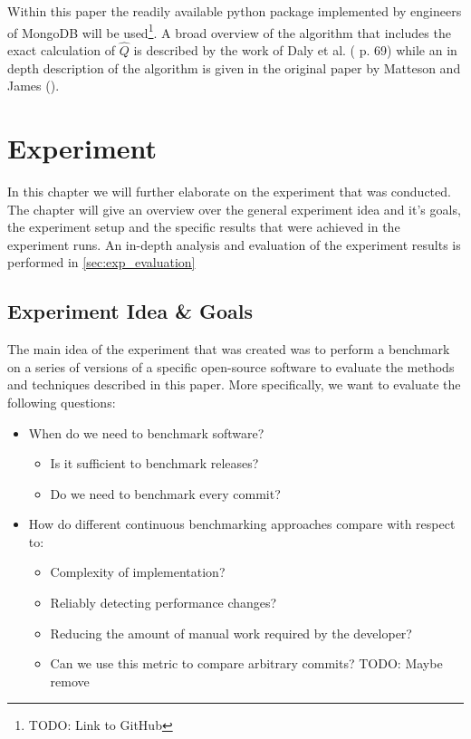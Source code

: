 \documentclass[	runningheads,
				a4paper]{llncs}
\begin{document}
	Within this paper the readily available python package implemented by engineers of MongoDB will be used\footnote{TODO: Link to GitHub}. A broad overview of the algorithm that includes the exact calculation of $\hat{Q}$ is described by the work of Daly et al. (\cite{daly2020} p. 69) while an in depth description of the algorithm is given in the original paper by Matteson and James (\cite{Matteson2014}).

\section{Experiment}
In this chapter we will further elaborate on the experiment that was conducted. The chapter will give an overview over the general experiment idea and it's goals, the experiment setup and the specific results that were achieved in the experiment runs. An in-depth analysis and evaluation of the experiment results is performed in \autoref{sec:exp_evaluation}

	\subsection{Experiment Idea \& Goals}
	\label{ssec:exp_goals}

	The main idea of the experiment that was created was to perform a benchmark on a series of versions of a specific open-source software to evaluate the methods and techniques described in this paper. More specifically, we want to evaluate the following questions:
	\begin{itemize}
		\item When do we need to benchmark software?
			\begin{itemize}
				\item Is it sufficient to benchmark releases?
				\item Do we need to benchmark every commit?
			\end{itemize}
		\item How do different continuous benchmarking approaches compare with respect to:
			\begin{itemize}
				\item Complexity of implementation?
				\item Reliably detecting performance changes?
				\item Reducing the amount of manual work required by the developer?
				\item Can we use this metric to compare arbitrary commits? TODO: Maybe remove
			\end{itemize}
	\end{itemize}
\end{document}
